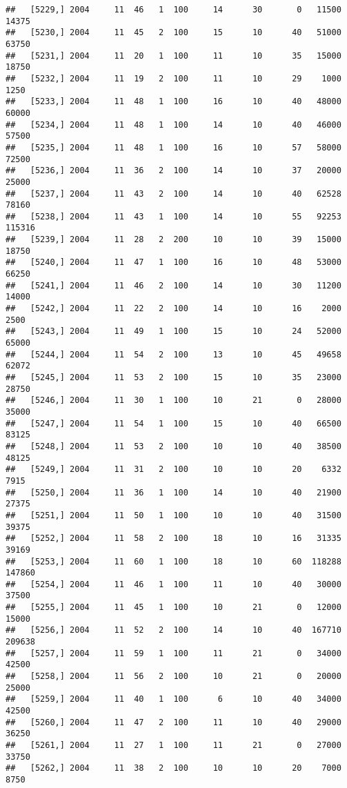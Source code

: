 \documentclass{article}\usepackage[]{graphicx}\usepackage[]{color}
\makeatletter
\newenvironment{kframe}{%
 \def\at@end@of@kframe{}%
 \ifinner\ifhmode%
  \def\at@end@of@kframe{\end{minipage}}%
  \begin{minipage}{\columnwidth}%
 \fi\fi%
 \def\FrameCommand##1{\hskip\@totalleftmargin \hskip-\fboxsep
 \colorbox{shadecolor}{##1}\hskip-\fboxsep
     \hskip-\linewidth \hskip-\@totalleftmargin \hskip\columnwidth}%
 \MakeFramed {\advance\hsize-\width
   \@totalleftmargin\z@ \linewidth\hsize
   \@setminipage}}%
 {\par\unskip\endMakeFramed%
 \at@end@of@kframe}
\newenvironment{knitrout}{}{} %
\makeatother
\begin{document}
\begin{knitrout}
\begin{kframe}
\begin{verbatim}
##   [5229,] 2004     11  46   1  100     14      30       0   11500   14375
##   [5230,] 2004     11  45   2  100     15      10      40   51000   63750
##   [5231,] 2004     11  20   1  100     11      10      35   15000   18750
##   [5232,] 2004     11  19   2  100     11      10      29    1000    1250
##   [5233,] 2004     11  48   1  100     16      10      40   48000   60000
##   [5234,] 2004     11  48   1  100     14      10      40   46000   57500
##   [5235,] 2004     11  48   1  100     16      10      57   58000   72500
##   [5236,] 2004     11  36   2  100     14      10      37   20000   25000
##   [5237,] 2004     11  43   2  100     14      10      40   62528   78160
##   [5238,] 2004     11  43   1  100     14      10      55   92253  115316
##   [5239,] 2004     11  28   2  200     10      10      39   15000   18750
##   [5240,] 2004     11  47   1  100     16      10      48   53000   66250
##   [5241,] 2004     11  46   2  100     14      10      30   11200   14000
##   [5242,] 2004     11  22   2  100     14      10      16    2000    2500
##   [5243,] 2004     11  49   1  100     15      10      24   52000   65000
##   [5244,] 2004     11  54   2  100     13      10      45   49658   62072
##   [5245,] 2004     11  53   2  100     15      10      35   23000   28750
##   [5246,] 2004     11  30   1  100     10      21       0   28000   35000
##   [5247,] 2004     11  54   1  100     15      10      40   66500   83125
##   [5248,] 2004     11  53   2  100     10      10      40   38500   48125
##   [5249,] 2004     11  31   2  100     10      10      20    6332    7915
##   [5250,] 2004     11  36   1  100     14      10      40   21900   27375
##   [5251,] 2004     11  50   1  100     10      10      40   31500   39375
##   [5252,] 2004     11  58   2  100     18      10      16   31335   39169
##   [5253,] 2004     11  60   1  100     18      10      60  118288  147860
##   [5254,] 2004     11  46   1  100     11      10      40   30000   37500
##   [5255,] 2004     11  45   1  100     10      21       0   12000   15000
##   [5256,] 2004     11  52   2  100     14      10      40  167710  209638
##   [5257,] 2004     11  59   1  100     11      21       0   34000   42500
##   [5258,] 2004     11  56   2  100     10      21       0   20000   25000
##   [5259,] 2004     11  40   1  100      6      10      40   34000   42500
##   [5260,] 2004     11  47   2  100     11      10      40   29000   36250
##   [5261,] 2004     11  27   1  100     11      21       0   27000   33750
##   [5262,] 2004     11  38   2  100     10      10      20    7000    8750

\end{verbatim}
\end{kframe}
\end{knitrout}
\end{document}
